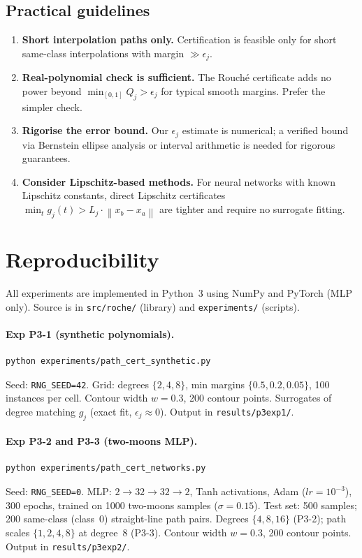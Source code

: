 \documentclass{article}
\theoremstyle{definition}
\newcommand{\norm}[1]{\left\|#1\right\|}
\begin{document}
\subsection{Practical guidelines}

\begin{enumerate}
  \item \textbf{Short interpolation paths only.}  Certification is feasible
    only for short same-class interpolations with margin $\gg \epsilon_j$.
  \item \textbf{Real-polynomial check is sufficient.}  The Rouch\'e certificate
    adds no power beyond $\min_{[0,1]} Q_j > \epsilon_j$ for typical smooth
    margins.  Prefer the simpler check.
  \item \textbf{Rigorise the error bound.}  Our $\epsilon_j$ estimate is
    numerical; a verified bound via Bernstein ellipse analysis or interval
    arithmetic is needed for rigorous guarantees.
  \item \textbf{Consider Lipschitz-based methods.}  For neural networks with
    known Lipschitz constants, direct Lipschitz
    certificates~\cite{weng2018evaluating}
    $\min_t g_j(t) > L_j \cdot \norm{x_b - x_a}$ are tighter and require no
    surrogate fitting.
\end{enumerate}

\section{Reproducibility}
\label{sec:repro}

All experiments are implemented in Python~3 using NumPy and PyTorch
(MLP only).  Source is in \texttt{src/roche/} (library) and
\texttt{experiments/} (scripts).

\paragraph{Exp P3-1 (synthetic polynomials).}
\begin{verbatim}
python experiments/path_cert_synthetic.py
\end{verbatim}
Seed: \texttt{RNG\_SEED=42}.
Grid: degrees $\{2,4,8\}$, min margins $\{0.5, 0.2, 0.05\}$,
100 instances per cell.
Contour width $w=0.3$, 200 contour points.
Surrogates of degree matching $g_j$ (exact fit, $\epsilon_j \approx 0$).
Output in \texttt{results/p3exp1/}.

\paragraph{Exp P3-2 and P3-3 (two-moons MLP).}
\begin{verbatim}
python experiments/path_cert_networks.py
\end{verbatim}
Seed: \texttt{RNG\_SEED=0}.
MLP: $2{\to}32{\to}32{\to}2$, Tanh activations, Adam ($lr=10^{-3}$),
300 epochs, trained on 1000 two-moons samples ($\sigma=0.15$).
Test set: 500 samples; 200 same-class (class~0) straight-line path pairs.
Degrees $\{4,8,16\}$ (P3-2); path scales $\{1,2,4,8\}$ at degree~8 (P3-3).
Contour width $w=0.3$, 200 contour points.
Output in \texttt{results/p3exp2/}.
\end{document}
